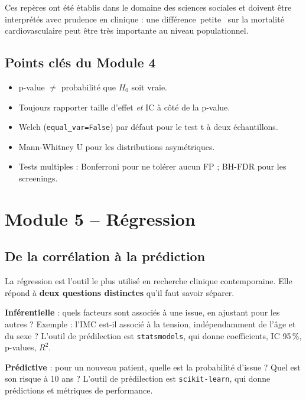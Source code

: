 \documentclass[11pt,a4paper]{article}
\providecommand{\og}{\guillemotleft\,}
\providecommand{\fg}{\,\guillemotright}
\begin{document}
Ces rep\`eres ont \'et\'e \'etablis dans le domaine des sciences sociales
et doivent \^etre interpr\'et\'es avec prudence en clinique : une
diff\'erence \og petite \fg{} sur la mortalit\'e cardiovasculaire peut
\^etre tr\`es importante au niveau populationnel.

\subsection{Points cl\'es du Module 4}

\begin{itemize}
  \item p-value $\neq$ probabilit\'e que $H_0$ soit vraie.
  \item Toujours rapporter taille d'effet \emph{et} IC \`a c\^ot\'e de la
        p-value.
  \item Welch (\texttt{equal\_var=False}) par d\'efaut pour le test t \`a
        deux \'echantillons.
  \item Mann-Whitney U pour les distributions asym\'etriques.
  \item Tests multiples : Bonferroni pour ne tol\'erer aucun FP ;
        BH-FDR pour les screenings.
\end{itemize}

\newpage


\section{Module 5 -- R\'egression}

\subsection{De la corr\'elation \`a la pr\'ediction}

La r\'egression est l'outil le plus utilis\'e en recherche clinique
contemporaine. Elle r\'epond \`a \textbf{deux questions distinctes} qu'il
faut savoir s\'eparer.

\textbf{Inf\'erentielle} : quels facteurs sont associ\'es \`a une issue,
en ajustant pour les autres ? Exemple : l'IMC est-il associ\'e \`a la
tension, ind\'ependamment de l'\^age et du sexe ? L'outil de
pr\'edilection est \texttt{statsmodels}, qui donne coefficients,
IC 95\,\%, p-values, $R^2$.

\textbf{Pr\'edictive} : pour un nouveau patient, quelle est la
probabilit\'e d'issue ? Quel est son risque \`a 10 ans ? L'outil de
pr\'edilection est \texttt{scikit-learn}, qui donne pr\'edictions et
m\'etriques de performance.
\end{document}
